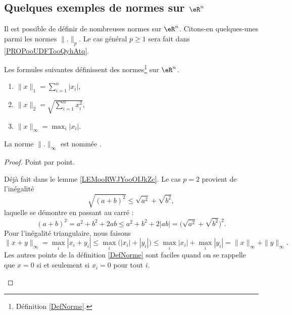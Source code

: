 \subsection{Quelques exemples de normes sur \texorpdfstring{\( \eR^n\)}{Rn}}

Il est possible de définir de nombreuses normes sur \( \eR^n\). Citons-en quelques-unes parmi les normes \( \| . \|_p\). Le cas général \( p\geq 1\) sera fait dans \ref{PROPooUDFTooQyhAtq}.

\begin{propositionDef}      \label{PROPooCLZRooIRxCnZ}
	Les formules suivantes définissent des normes\footnote{Définition \ref{DefNorme}.} sur \( \eR^n\).
	\begin{enumerate}
		\item       \label{ITEMooQBLGooPQKSev}
		      \( \| x \|_1=\sum_{i=1}^n| x_i |\),
		\item       \label{ITEMooXQUFooLHrITI}
		      \( \| x \|_2=\sqrt{ \sum_{i=1}^nx_i^2 }\),
		\item       \label{ITEMooSOVDooTuhEik}
		      \( \| x \|_{\infty}=\max_i| x_i |\).
	\end{enumerate}
	La norme \( \| . \|_{\infty}\) est nommée .
\end{propositionDef}

\begin{proof}
	Point par point.
	\begin{subproof}
		Déjà fait dans le lemme \ref{LEMooRWJYooOIJkZc}.
		Le cas \( p=2\) provient de l'inégalité
		\begin{equation}
			\sqrt{ (a+b)^2 }\leq \sqrt{ a^2 }+\sqrt{ b^2 },
		\end{equation}
		laquelle se démontre en passant au carré :
		\begin{equation}        \label{EQooRYNYooTzZpPz}
			(a+b)^2=a^2+b^2+2ab\leq a^2+b^2+2| ab |=\big( \sqrt{ a^2 }+\sqrt{ b^2 } \big)^2.
		\end{equation}
		Pour l'inégalité triangulaire, nous faisons
		\begin{equation}
			\| x+y \|_{\infty}=\max_i| x_i+y_i |\leq \max_i\big( | x_i |+| y_i | \big)\leq\max_i| x_i |+\max_i| y_i |=\| x \|_{\infty}+\| y \|_{\infty}.
		\end{equation}
		Les autres points de la définition \ref{DefNorme} sont faciles quand on se rappelle que \( x=0\) si et seulement si \( x_i=0\) pour tout \( i\).
	\end{subproof}
\end{proof}

